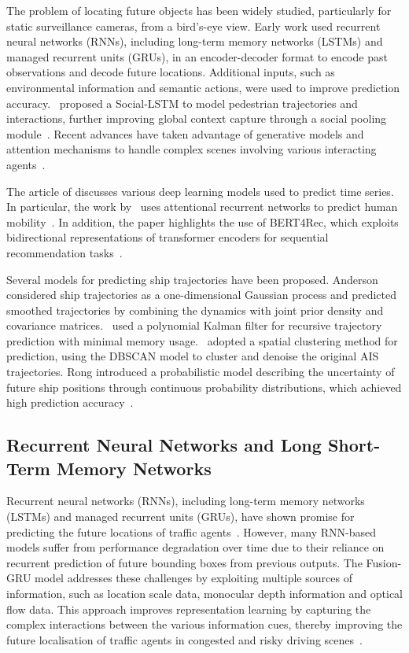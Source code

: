 \documentclass[12pt,oneside]{book} %
\begin{document}
The problem of locating future objects has been widely studied, particularly
for static surveillance cameras, from a bird's-eye view. Early work used
recurrent neural networks (RNNs), including long-term memory networks (LSTMs)
and managed recurrent units (GRUs), in an encoder-decoder format to encode past
observations and decode future locations. Additional inputs, such as
environmental information and semantic actions, were used to improve prediction
accuracy.~\citet{Alahi2016} proposed a Social-LSTM to model pedestrian
trajectories and interactions, further improving global context capture through
a social pooling module~\cite{FusionGRU}. Recent advances have taken advantage
of generative models and attention mechanisms to handle complex scenes
involving various interacting agents~\cite{FusionGRU}.

The article of \citet{SpatioTemporalTransformerRecommender} discusses various
deep learning models used to predict time series. In particular, the work
by~\citet{Feng2018} uses attentional recurrent networks to predict human
mobility~\cite{SpatioTemporalTransformerRecommender}. In addition, the paper
highlights the use of BERT4Rec, which exploits bidirectional representations of
transformer encoders for sequential recommendation
tasks~\cite{SpatioTemporalTransformerRecommender}.

Several models for predicting ship trajectories have been proposed. Anderson
considered ship trajectories as a one-dimensional Gaussian process and
predicted smoothed trajectories by combining the dynamics with joint prior
density and covariance matrices.~\citet{Jiang} used a polynomial Kalman filter
for recursive trajectory prediction with minimal memory
usage.~\citet{Zhang2018} adopted a spatial clustering method for prediction,
using the DBSCAN model to cluster and denoise the original AIS trajectories.
Rong introduced a probabilistic model describing the uncertainty of future ship
positions through continuous probability distributions, which achieved high
prediction accuracy~\cite{WaterShipTrajectoryPrediction}.

\subsection{Recurrent Neural Networks and Long Short-Term Memory Networks}
Recurrent neural networks (RNNs), including long-term memory networks (LSTMs)
and managed recurrent units (GRUs), have shown promise for predicting the
future locations of traffic agents~\cite{FusionGRU}. However, many RNN-based
models suffer from performance degradation over time due to their reliance on
recurrent prediction of future bounding boxes from previous outputs. The
Fusion-GRU model addresses these challenges by exploiting multiple sources of
information, such as location scale data, monocular depth information and
optical flow data. This approach improves representation learning by capturing
the complex interactions between the various information cues, thereby
improving the future localisation of traffic agents in congested and risky
driving scenes~\cite{FusionGRU}.
\end{document}
